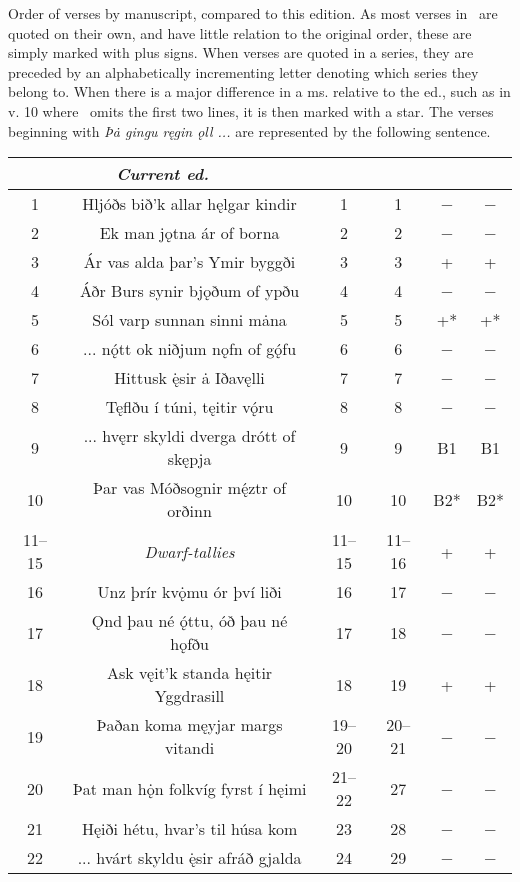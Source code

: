 Order of verses by manuscript, compared to this edition. As most verses in \GylfMS\ are quoted on their own, and have little relation to the original order, these are simply marked with plus signs. When verses are quoted in a series, they are preceded by an alphabetically incrementing letter denoting which series they belong to. When there is a major difference in a ms. relative to the ed., such as in v. 10 where \GylfMS\ omits the first two lines, it is then marked with a star. The verses beginning with \emph{Þȧ gingu ręgin ǫll ...} are represented by the following sentence.
\begin{longtable}{|c c c c c c|}
	\hline
	\multicolumn{2}{|c}{\emph{Current ed.}} & \Regius & \Hauksbok & \RegiusProse\Trajectinus\Wormianus & \Upsaliensis \\ [0.5ex]
	\hline\hline
	1 & Hljóðs bið’k allar hęlgar kindir & 1 & 1 & − & − \\
	2 & Ek man jǫtna ár of borna & 2 & 2 & − & − \\
	3 & Ár vas alda þar’s Ymir byggði & 3 & 3 & + & + \\
	4 & Áðr Burs synir bjǫðum of ypðu & 4 & 4 & − & − \\
	5 & Sól varp sunnan sinni mȧna & 5 & 5 & +* & +* \\
	6 & ... nǫ́tt ok niðjum nǫfn of gǫ́fu & 6 & 6 & − & − \\
	7 & Hittusk ę̇sir ȧ Iðavęlli & 7 & 7 & − & − \\
	8 & Tęflðu í túni, tęitir vǫ́ru & 8 & 8 & − & − \\
	9 & ... hvęrr skyldi dverga drótt of skępja & 9 & 9 & B1 & B1 \\
	10 & Þar vas Móðsognir mę́ztr of orðinn & 10 & 10 & B2* & B2* \\
	11–15 & \emph{Dwarf-tallies} & 11–15 & 11–16 & + & + \\
	16 & Unz þrír kvǫ̇mu ór því liði & 16 & 17 & − & − \\
	17 & Ǫnd þau né ǫ́ttu, óð þau né hǫfðu & 17 & 18 & − & − \\
	18 & Ask vęit’k standa hęitir Yggdrasill & 18 & 19 & + & + \\
	19 & Þaðan koma męyjar margs vitandi & 19–20 & 20–21 & − & − \\
	20 & Þat man hǫ̇n folkvíg fyrst í hęimi & 21–22 & 27 & − & − \\
	21 & Hęiði hétu, hvar’s til húsa kom & 23 & 28 & − & − \\
	22 & ... hvárt skyldu ę̇sir afráð gjalda & 24 & 29 & − & − \\

\end{longtable}
